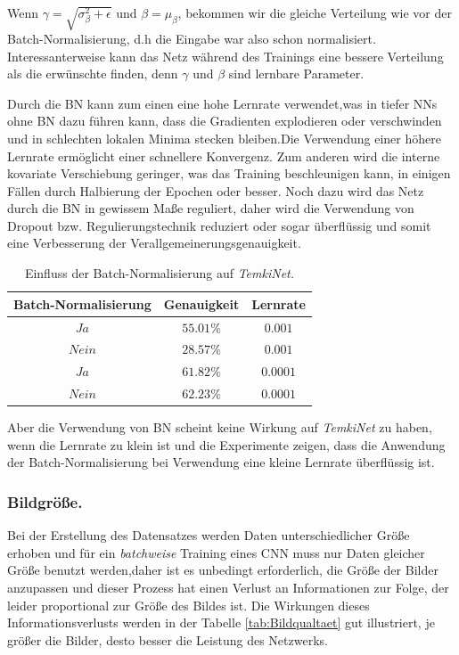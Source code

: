 \documentclass[12pt,a4paper]{scrartcl}
\numberwithin{equation}{section}
\begin{document}
Wenn $\gamma = \sqrt{\sigma_\beta^2 + \epsilon}$ und $\beta = \mu_\beta $, bekommen wir die gleiche Verteilung wie vor der Batch-Normalisierung, d.h die Eingabe war also schon normalisiert. Interessanterweise kann das Netz während des Trainings eine bessere Verteilung als die erwünschte finden, denn $\gamma$ und $\beta$ sind lernbare Parameter.

Durch die BN kann zum einen eine hohe Lernrate verwendet,was in tiefer \acsp{NN} ohne BN dazu führen kann, dass die Gradienten explodieren oder verschwinden und in schlechten lokalen Minima stecken bleiben.Die Verwendung einer höhere Lernrate ermöglicht einer schnellere Konvergenz.
Zum anderen wird die interne kovariate Verschiebung geringer, was das Training beschleunigen kann, in einigen Fällen durch Halbierung der Epochen oder besser. Noch dazu wird das Netz durch die BN in gewissem Maße reguliert, daher wird die Verwendung von Dropout bzw. Regulierungstechnik reduziert oder sogar überflüssig und somit eine Verbesserung der Verallgemeinerungsgenauigkeit.

\begin{table}[ht]
	\centering
	\begin{tabular}{*{3}{|c}| }
		\hline
		Batch-Normalisierung 	& Genauigkeit & Lernrate\\ \hline
		$ Ja $		&$ 55.01\% $  &$0.001$ 	\\ \hline	
		$ Nein $	&$28.57 \% $  &$0.001 $	\\ \hline
		$ Ja $		&$ 61.82\% $  &$0.0001$	\\ \hline
		$ Nein $	&$ 62.23\% $  &$0.0001$	\\ \hline

	\end{tabular}
	\caption{Einfluss der Batch-Normalisierung auf \textit{TemkiNet.}}
	\label{tab:batchnormalisierung}
\end{table}
 Aber die Verwendung von BN scheint keine Wirkung auf \textit{TemkiNet} zu haben, wenn die Lernrate zu klein ist und die Experimente zeigen, dass die Anwendung der Batch-Normalisierung bei Verwendung eine kleine Lernrate überflüssig ist.
\subsubsection{Bildgröße.}	
Bei der Erstellung des Datensatzes werden Daten unterschiedlicher Größe erhoben und für ein \textit{batchweise} Training eines CNN muss nur Daten gleicher Größe benutzt werden,daher ist es unbedingt erforderlich, die Größe der Bilder anzupassen und dieser Prozess hat einen Verlust an Informationen zur Folge, der leider proportional zur Größe des Bildes ist. Die Wirkungen dieses Informationsverlusts werden in der Tabelle \ref{tab:Bildqualtaet} gut illustriert, je größer die Bilder, desto besser die Leistung des Netzwerks.
	
\end{document}
